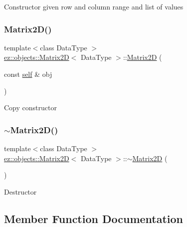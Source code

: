 Constructor given row and column range and list of values \mbox{\label{classez_1_1objects_1_1Matrix2D_aeebbde5d2059f7e190759dfc0412f353}} 
\subsubsection{\texorpdfstring{Matrix2\+D()}{Matrix2D()}\hspace{0.1cm}{\footnotesize\ttfamily [4/4]}}
{\footnotesize\ttfamily template$<$class Data\+Type $>$ \\
\hyperlink{classez_1_1objects_1_1Matrix2D}{ez\+::objects\+::\+Matrix2D}$<$ Data\+Type $>$\+::\hyperlink{classez_1_1objects_1_1Matrix2D}{Matrix2D} (\begin{DoxyParamCaption}\item[{const \hyperlink{classez_1_1objects_1_1Matrix2D}{self} \&}]{obj }\end{DoxyParamCaption})\hspace{0.3cm}{\ttfamily [inline]}}

Copy constructor \mbox{\label{classez_1_1objects_1_1Matrix2D_a3de573bc8beb0160ebb6bdfa7bf4daa2}} 
\subsubsection{\texorpdfstring{$\sim$\+Matrix2\+D()}{~Matrix2D()}}
{\footnotesize\ttfamily template$<$class Data\+Type $>$ \\
\hyperlink{classez_1_1objects_1_1Matrix2D}{ez\+::objects\+::\+Matrix2D}$<$ Data\+Type $>$\+::$\sim$\hyperlink{classez_1_1objects_1_1Matrix2D}{Matrix2D} (\begin{DoxyParamCaption}{ }\end{DoxyParamCaption})\hspace{0.3cm}{\ttfamily [inline]}}

Destructor 

\subsection{Member Function Documentation}
\mbox{\label{classez_1_1objects_1_1Matrix2D_ab0b55556ba7c31aa5ad376a91b63d6c3}} 
